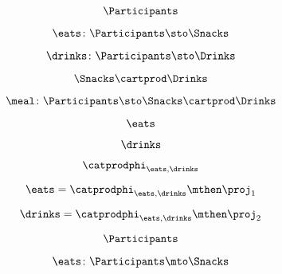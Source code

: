 {\begin{forslides}
    \begin{equation}
        \label{eq:feedback-041}
        \Participants
    \end{equation}

    \begin{equation}
        \label{eq:feedback-042}
        \eats \colon \Participants \sto \Snacks
    \end{equation}

    \begin{equation}
        \label{eq:feedback-043}
        \drinks \colon  \Participants \sto \Drinks
    \end{equation}

    \begin{equation}
        \label{eq:feedback-044}
        \Snacks\cartprod \Drinks
    \end{equation}

    \begin{equation}
        \label{eq:feedback-045}
        \meal \colon \Participants\sto \Snacks\cartprod \Drinks
    \end{equation}

    \begin{equation}
        \label{eq:feedback-046}
        \eats
    \end{equation}

    \begin{equation}
        \label{eq:feedback-047}
        \drinks
    \end{equation}

    \begin{equation}
        \label{eq:feedback-048}
        \catprodphi_{\eats,\drinks}
    \end{equation}

    \begin{equation}
        \label{eq:feedback-049}
        \eats =\catprodphi_{\eats,\drinks}\mthen \proj_1
    \end{equation}

    \begin{equation}
        \label{eq:feedback-050}
        \drinks=\catprodphi_{\eats,\drinks}\mthen \proj_2
    \end{equation}

    \begin{equation}
        \label{eq:feedback-051}
        \Participants
    \end{equation}

    \begin{equation}
        \label{eq:feedback-052}
        \eats\colon \Participants \mto \Snacks
    \end{equation}


\end{forslides}}
